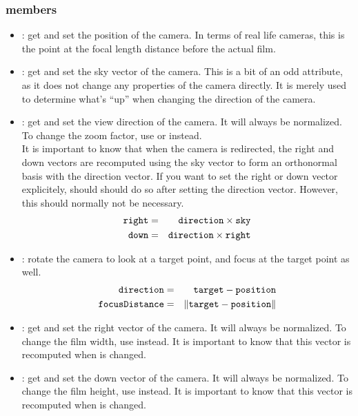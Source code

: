 \subsubsection*{members}
\begin{itemize}
	\item {}:
		get and set the position of the camera.  In terms of real life cameras, this is the point at the focal length distance before the actual film.

 	\item {}:
 	  get and set the sky vector of the camera.  This is a bit of an odd attribute, as it does not change any properties of the camera directly.  It is merely used to determine what's ``up'' when changing the direction of the camera.

	\item {}:
		get and set the view direction of the camera.  It will always be normalized.  To change the zoom factor, use  or  instead.\\
		It is important to know that when the camera is redirected, the right and down vectors are recomputed using the sky vector to form an orthonormal basis with the direction vector.  If you want to set the right or down vector explicitely, should should do so after setting the direction vector.  However, this should normally not be necessary.
	  \begin{eqnarray}
	  	\kw{right} &=& \kw{direction} \times \kw{sky}\\
	  	\kw{down} &=& \kw{direction} \times \kw{right}
	  \end{eqnarray}

	\item {}:
	  rotate the camera to look at a target point, and focus at the target point as well.
	  \begin{eqnarray}
	  	\kw{direction} &=& \kw{target} - \kw{position}\\
	  	\kw{focusDistance} &=& \left\|\kw{target} - \kw{position}\right\|
	  \end{eqnarray}

 	\item {}:
 	  get and set the right vector of the camera.  It will always be normalized.  To change the film width, use  instead.  It is important to know that this vector is recomputed when  is changed.

 	\item {}:
 	  get and set the down vector of the camera.  It will always be normalized.  To change the film height, use  instead.  It is important to know that this vector is recomputed when  is changed.


\end{itemize}
